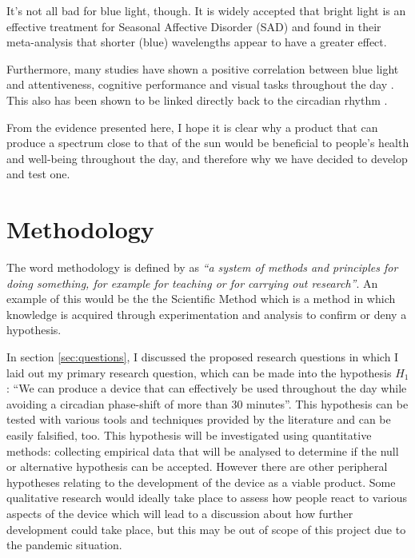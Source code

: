 \documentclass[twoside,twocolumn]{article}
\begin{document}
It's not all bad for blue light, though. It is widely accepted that bright light is an effective treatment for Seasonal Affective Disorder (SAD) \citep{eastmanBrightLightTreatment1998, magnussonTreatmentSeasonalAffective1991} and \cite{leeSpectralPropertiesPhototherapy1997} found in their meta-analysis that shorter (blue) wavelengths appear to have a greater effect.

Furthermore, many studies have shown a positive correlation between blue light and attentiveness, cognitive performance and visual tasks throughout the day \citep{sun-youngExperimentLightingEnvironment2005, millsEffectHighCorrelated2007, lehrlBlueLightImproves2007, hawesEffectsFourWorkplace2012}. This also has been shown to be linked directly back to the circadian rhythm \citep{hawesEffectsFourWorkplace2012}.

From the evidence presented here, I hope it is clear why a product that can produce a spectrum close to that of the sun would be beneficial to people's health and well-being throughout the day, and therefore why we have decided to develop and test one.


\section{Methodology}
\label{sec:method}

The word methodology is defined by \cite{CollinsEnglishDictionary2014} as \emph{``a system of methods and principles for doing something, for example for teaching or for carrying out research''}. An example of this would be the the Scientific Method which is a method in which knowledge is acquired through experimentation and analysis to confirm or deny a hypothesis. 

In section \ref{sec:questions}, I discussed the proposed research questions in which I laid out my primary research question, which can be made into the hypothesis $H_1$: ``We can produce a device that can effectively be used throughout the day while avoiding a circadian phase-shift of more than 30 minutes''. This hypothesis can be tested with various tools and techniques provided by the literature and can be easily falsified, too.
This hypothesis will be investigated using quantitative methods: collecting empirical data that will be analysed to determine if the null or alternative hypothesis can be accepted.
However there are other peripheral hypotheses relating to the development of the device as a viable product. Some qualitative research would ideally take place to assess how people react to various aspects of the device which will lead to a discussion about how further development could take place, but this may be out of scope of this project due to the pandemic situation.
\end{document}
